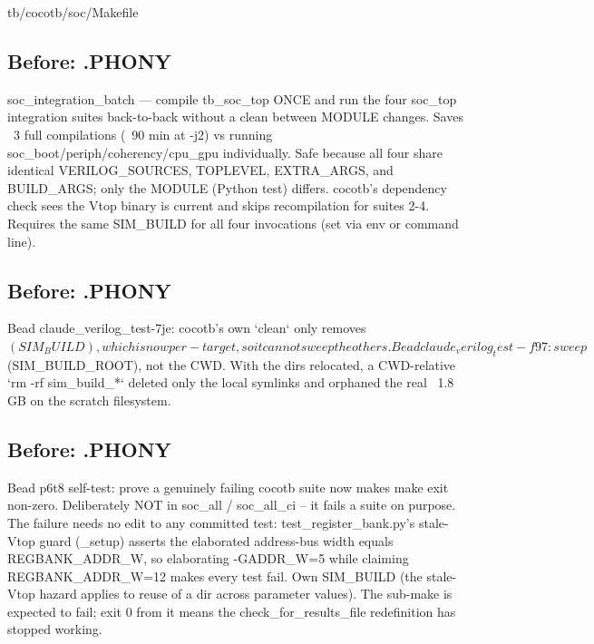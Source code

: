 \begin{relocated}{tb/cocotb/soc/Makefile}
\subsection*{Before: .PHONY}

\begin{textblock}
soc_integration_batch — compile tb_soc_top ONCE and run the four soc_top integration
suites back-to-back without a clean between MODULE changes.
Saves ~3 full compilations (~90 min at -j2) vs running soc_boot/periph/coherency/cpu_gpu
individually. Safe because all four share identical VERILOG_SOURCES, TOPLEVEL, EXTRA_ARGS,
and BUILD_ARGS; only the MODULE (Python test) differs. cocotb's dependency check sees the
Vtop binary is current and skips recompilation for suites 2-4.
Requires the same SIM_BUILD for all four invocations (set via env or command line).
\end{textblock}

\subsection*{Before: .PHONY}

\begin{textblock}
Bead claude_verilog_test-7je: cocotb's own `clean` only removes $(SIM_BUILD),
which is now per-target, so it cannot sweep the others.
Bead claude_verilog_test-f97: sweep $(SIM_BUILD_ROOT), not the CWD.  With the
dirs relocated, a CWD-relative `rm -rf sim_build_*` deleted only the local
symlinks and orphaned the real ~1.8 GB on the scratch filesystem.
\end{textblock}

\subsection*{Before: .PHONY}

\begin{textblock}
Bead p6t8 self-test: prove a genuinely failing cocotb suite now makes make exit non-zero.
Deliberately NOT in soc_all / soc_all_ci -- it fails a suite on purpose.  The failure needs
no edit to any committed test: test_register_bank.py's stale-Vtop guard (_setup) asserts
the elaborated address-bus width equals REGBANK_ADDR_W, so elaborating -GADDR_W=5 while
claiming REGBANK_ADDR_W=12 makes every test fail.  Own SIM_BUILD (the stale-Vtop hazard
applies to reuse of a dir across parameter values).  The sub-make is expected to fail;
exit 0 from it means the check_for_results_file redefinition has stopped working.
\end{textblock}


\end{relocated}
